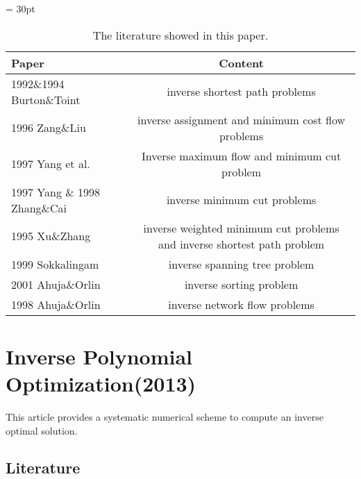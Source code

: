 \documentclass[UTF8]{article}
\begin{document}
\begin{table}[!h]

 \tabcolsep = 30pt

 \small\renewcommand{}

 \caption{The literature showed in this paper.\label{tab:4}}

 {\begin{tabular}{lc}
   \hline
   Paper                        & Content                                                                 \\
   \hline
   1992\&1994 Burton\&Toint     & inverse shortest path problems                                          \\
   \hline
   1996 Zang\&Liu               & inverse assignment and minimum cost flow problems                       \\
   \hline
   1997 Yang et al.             & Inverse maximum flow and minimum cut problem                            \\
   \hline
   1997 Yang \& 1998 Zhang\&Cai & inverse minimum cut problems                                            \\
   \hline
   1995 Xu\&Zhang               & inverse weighted minimum cut problems and inverse shortest path problem \\
   \hline
   1999 Sokkalingam             & inverse spanning tree problem                                           \\
   \hline
   2001 Ahuja\&Orlin            & inverse sorting problem                                                 \\
   \hline
   1998 Ahuja\&Orlin            & inverse network flow problems                                           \\
   \hline
  \end{tabular}}
 {}
\end{table}




\section{Inverse Polynomial Optimization(2013)}


This article provides a systematic numerical scheme to compute an inverse optimal solution.

\subsection{Literature}
\end{document}

